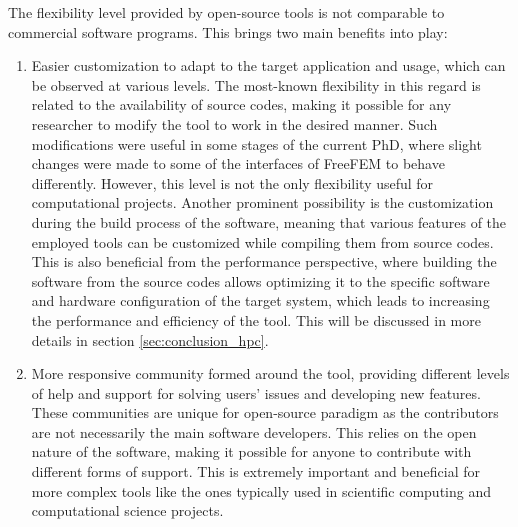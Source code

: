 The flexibility level provided by open-source tools is not comparable to commercial software programs. This brings two main benefits into play:
\begin{enumerate}
\item
Easier customization to adapt to the target application and usage, which can be observed at various levels. The most-known flexibility in this regard is related to the availability of source codes, making it possible for any researcher to modify the tool to work in the desired manner. Such modifications were useful in some stages of the current PhD, where slight changes were made to some of the interfaces of FreeFEM to behave differently. However, this level is not the only flexibility useful for computational projects. Another prominent possibility is the customization during the build process of the software, meaning that various features of the employed tools can be customized while compiling them from source codes. This is also beneficial from the performance perspective, where building the software from the source codes allows optimizing it to the specific software and hardware configuration of the target system, which leads to increasing the performance and efficiency of the tool. This will be discussed in more details in section \ref{sec:conclusion_hpc}.
\item
More responsive community formed around the tool, providing different levels of help and support for solving users' issues and developing new features. These communities are unique for open-source paradigm as the contributors are not necessarily the main software developers. This relies on the open nature of the software, making it possible for anyone to contribute with different forms of support. This is extremely important and beneficial for more complex tools like the ones typically used in scientific computing and computational science projects.
\end{enumerate}

